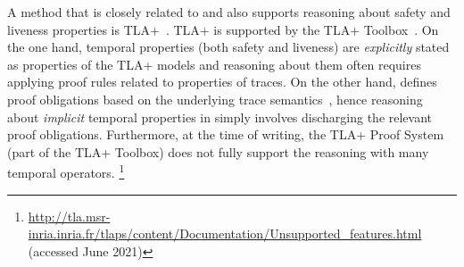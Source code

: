   A method that is closely related to \mbox{\EventB} and also supports
  reasoning about safety and liveness properties is
  TLA+~\mbox{\cite{DBLP:books/aw/Lamport2002}}. TLA+ is supported by
  the TLA+ Toolbox~\mbox{\cite{DBLP:journals/corr/abs-1912-10633}}.
  On the one hand, temporal properties (both safety and liveness) are
  \emph{explicitly} stated as properties of the TLA+ models and
  reasoning about them often requires applying proof rules related to
  properties of traces. On the other hand, \mbox{\EventB} defines
  proof obligations based on the underlying trace
  semantics~\mbox{\cite{abrial10:_model_event_b,hoang2016ltl,hudon16:_unit_b_method}},
  hence reasoning about \emph{implicit} temporal properties in
  \mbox{\EventB} simply involves discharging the relevant proof
  obligations. Furthermore, at the time of writing, the TLA+ Proof
  System (part of the TLA+ Toolbox) does not fully support the
  reasoning with many temporal operators.%
\footnote{\url{http://tla.msr-inria.inria.fr/tlaps/content/Documentation/Unsupported_features.html}
  (accessed June 2021)}







